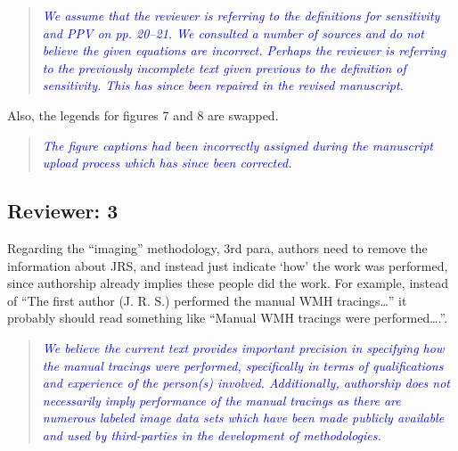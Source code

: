 \documentclass[12pt,]{article}
\begin{document}
\begin{quote}
\emph{\textcolor{blue}{We assume that the reviewer is referring to the definitions for
sensitivity and PPV on pp. 20--21.  We consulted a number of sources and do not believe
the given equations are incorrect.  Perhaps the reviewer is referring to the previously
incomplete text given previous to the definition of sensitivity. This has since been
repaired in the revised manuscript.}}
\end{quote}

Also, the legends for figures 7 and 8 are swapped.

\begin{quote}
\emph{\textcolor{blue}{The figure captions had been incorrectly assigned during the
manuscript upload process which has since been corrected.}}
\end{quote}

\subsection{Reviewer: 3}\label{reviewer-3}

Regarding the ``imaging'' methodology, 3rd para, authors need to remove
the information about JRS, and instead just indicate `how' the work was
performed, since authorship already implies these people did the work.
For example, instead of ``The first author (J. R. S.) performed the
manual WMH tracings\ldots{}'' it probably should read something like
``Manual WMH tracings were performed\ldots{}.''.

\begin{quote}
\emph{\textcolor{blue}{We believe the current text provides important precision in specifying
how the manual tracings were performed, specifically in terms of qualifications and experience
of the person(s) involved.    Additionally, authorship does not necessarily imply performance of the manual tracings as
there are numerous labeled image data sets which have been made publicly available and used
by third-parties in the development of methodologies.}}
\end{quote}

\hypertarget{refs}{}
\end{document}
